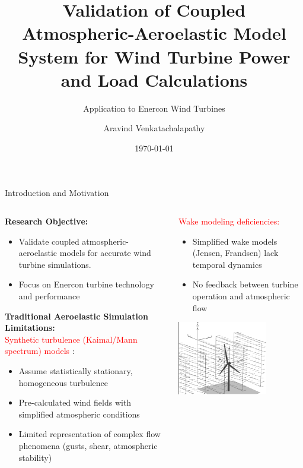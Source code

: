 \documentclass[aspectratio=1610]{beamer}
\title{Validation of Coupled Atmospheric-Aeroelastic Model System for Wind Turbine Power and Load Calculations}
\subtitle{Application to Enercon Wind Turbines}
\author{Aravind Venkatachalapathy}
\institute{Enercon}
\date{\today}
\begin{document}
\frame{\titlepage}

\begin{frame}{Introduction and Motivation}
    \begin{columns}
        \begin{column}{0.6\textwidth}
            \textbf{Research Objective:}
            \begin{itemize}
                \item Validate coupled atmospheric- aeroelastic models for accurate wind turbine simulations.
                \item Focus on Enercon turbine technology and performance
            \end{itemize}
            \textbf{Traditional Aeroelastic Simulation Limitations:}\\
             \textcolor{red}{Synthetic turbulence (Kaimal/Mann spectrum) models} :
                \begin{itemize}
                    \item Assume statistically stationary, homogeneous turbulence
                    \item Pre-calculated wind fields with simplified atmospheric conditions
                    \item Limited representation of complex flow phenomena (gusts, shear, atmospheric stability)
                \end{itemize}
        \end{column}
        \begin{column}{0.4\textwidth}
                \textcolor{red}{Wake modeling deficiencies:}
                \begin{itemize}
                    \item Simplified wake models (Jensen, Frandsen) lack temporal dynamics
                    \item No feedback between turbine operation and atmospheric flow
                \end{itemize}
            
            \vfill
            \begin{center}
              \includegraphics[width=0.7\textwidth]{wind.png}  
            \end{center}
            

\end{column}
\end{columns}
\end{frame}
\end{document}
